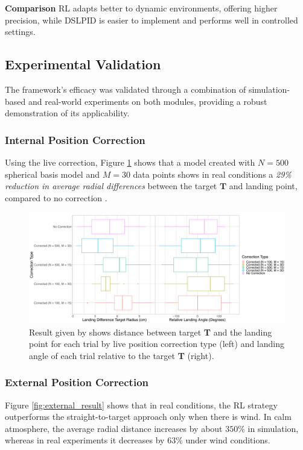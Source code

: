 \documentclass[10pt,journal,compsoc]{IEEEtran}
\begin{document}
\textbf{Comparison} RL adapts better to dynamic environments, offering higher precision, while DSLPID is easier to implement and performs well in controlled settings.

\subsection{Experimental Validation}
The framework’s efficacy was validated through a combination of simulation-based and real-world experiments on both modules, providing a robust demonstration of its applicability.

\subsubsection{Internal Position Correction}

Using the live correction, Figure \ref{fig:result_internal} shows that a model created with $N=500$ spherical basis model and $M=30$ data points shows in real conditions a \emph{29\% reduction in average radial differences} between the target $\mathbf{T}$ and landing point, compared to no correction \cite{studied}.

\begin{figure}[h]
    \centering
    \includegraphics[width=\linewidth]{rsc/result_fig8.png}
    \caption{Result given by \cite{studied} shows distance between target \textbf{T} and the landing point for each trial by live position correction type (left) and landing angle of each trial relative to the target \textbf{T} (right).}
    \label{fig:result_internal}
\end{figure}

\subsubsection{External Position Correction}

Figure \ref{fig:external_result} shows that in real conditions, the RL strategy outperforms the straight-to-target approach only when there is wind. In calm atmosphere, the average radial distance increases by about $350\%$ in simulation, whereas in real experiments it decreases by $63\%$ under wind conditions.
\end{document}
